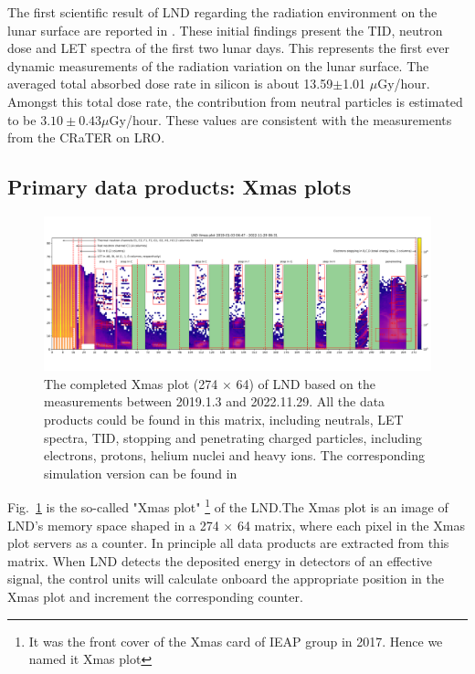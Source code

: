 The first scientific result of \ac{LND} regarding the radiation environment on the lunar surface are reported in \citep{Zhang-2020-LND-firstresults}. These initial findings present the \ac{TID}, neutron dose and \ac{LET} spectra of the first two lunar days. This represents the first ever dynamic measurements of the radiation variation on the lunar surface. The averaged total absorbed dose rate in silicon is about 13.59$\pm$1.01 $\mu$Gy/hour. Amongst this total dose rate, the contribution from neutral particles is estimated to be $3.10 \pm 0.43 \mu$Gy/hour. These values are consistent with the measurements from the \ac{CRaTER} on \ac{LRO}.



\subsection{Primary data products: Xmas plots}
\label{sec:xmas}

\begin{figure}
    \centering
    \includegraphics[width =0.8\textheight, height = 0.6\textheight, angle = 90]{images/xmas-2019-01-03To2022-11-29.png}
    \caption[\ac{LND} Xmas plot from measurements]{The completed Xmas plot (274 $\times$ 64) of \ac{LND} based on the measurements between 2019.1.3 and 2022.11.29. All the data products could be found in this matrix, including neutrals, \ac{LET} spectra, \ac{TID}, stopping and penetrating charged particles, including electrons, protons, helium nuclei and heavy ions. The corresponding simulation version can be found in \citep{Wimmer2020SSRv}}
    \label{Fig:measurement_Xmas}
\end{figure}

Fig.~\ref{Fig:measurement_Xmas} is the so-called "Xmas plot" \footnote{It was the front cover of the Xmas card of IEAP group in 2017. Hence we named it Xmas plot} of the \ac{LND}.The Xmas plot is an image of \ac{LND}'s memory space shaped in a 274 $\times$ 64 matrix, where each pixel in the Xmas plot servers as a counter. In principle all data products are extracted from this matrix. 
When \ac{LND} detects the deposited energy in detectors of an effective signal, the control units will calculate onboard the appropriate position in the Xmas plot and increment the corresponding counter. 

